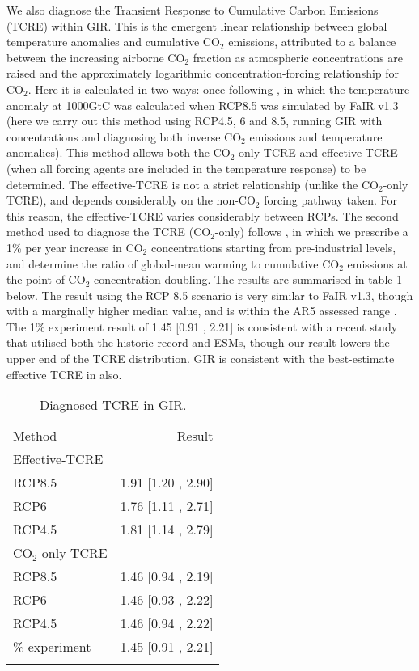 \documentclass[gmd, manuscript]{copernicus}
\begin{document}
We also diagnose the Transient Response to Cumulative Carbon Emissions (TCRE) within GIR. This is the emergent linear relationship between global temperature anomalies and cumulative CO$_2$ emissions, attributed to a balance between the increasing airborne CO$_2$ fraction as atmospheric concentrations are raised and the approximately logarithmic concentration-forcing relationship for CO$_2$. Here it is calculated in two ways: once following \citeauthor{Smith2017}, in which the temperature anomaly at 1000GtC was calculated when RCP8.5 was simulated by FaIR v1.3 (here we carry out this method using RCP4.5, 6 and 8.5, running GIR with concentrations and diagnosing both inverse CO$_2$ emissions and temperature anomalies). This method allows both the CO$_2$-only TCRE and effective-TCRE (when all forcing agents are included in the temperature response) to be determined. The effective-TCRE is not a strict relationship (unlike the CO$_2$-only TCRE), and depends considerably on the non-CO$_2$ forcing pathway taken. For this reason, the effective-TCRE varies considerably between RCPs. The second method used to diagnose the TCRE (CO$_2$-only) follows \cite{Gillett2013}, in which we prescribe a 1\% per year increase in CO$_2$ concentrations starting from pre-industrial levels, and determine the ratio of global-mean warming to cumulative CO$_2$ emissions at the point of CO$_2$ concentration doubling. The results are summarised in table \ref{tab:TCREresults} below. The result using the RCP 8.5 scenario is very similar to FaIR v1.3, though with a marginally higher median value, and is within the AR5 assessed range \citep{Collins2013}. The 1\% experiment result of 1.45 [0.91 , 2.21] is consistent with a recent study \citep{Millar20160449} that utilised both the historic record and ESMs, though our result lowers the upper end of the TCRE distribution. GIR is consistent with the best-estimate effective TCRE in \citeauthor{Millar20160449} also.

\begin{table}[t]
    \caption{Diagnosed TCRE in GIR.} \label{tab:TCREresults}
    \begin{tabular}{l r}
    \tophline
        Method & Result\\
    \middlehline
        Effective-TCRE & \\
        RCP8.5 & 1.91 [1.20 , 2.90]\\
        RCP6 & 1.76 [1.11 , 2.71]\\
        RCP4.5 & 1.81 [1.14 , 2.79]\\
    \middlehline
        CO$_2$-only TCRE & \\
        RCP8.5 & 1.46 [0.94 , 2.19]\\
        RCP6 & 1.46 [0.93 , 2.22]\\
        RCP4.5 & 1.46 [0.94 , 2.22]\\
    \middlehline
        1\% experiment & 1.45 [0.91 , 2.21]\\
    \bottomhline
    \end{tabular}
    \belowtable{} %
\end{table}
\end{document}
